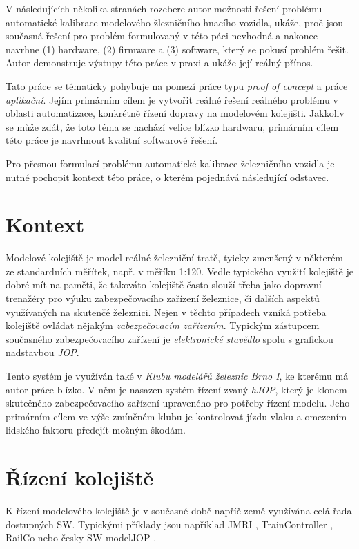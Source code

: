 V následujících několika stranách rozebere autor možnosti řešení problému
automatické kalibrace modelového žlezničního hnacího vozidla, ukáže, proč
jsou současná řešení pro problém formulovaný v této páci nevhodná a nakonec
navrhne (1) hardware, (2) firmware a (3) software, který se pokusí problém
řešit. Autor demonstruje výstupy této práce v praxi a ukáže její reálný
přínos.

Tato práce se tématicky pohybuje na pomezí práce typu \textit{proof of concept}
a práce \textit{aplikační}. Jejím primárním cílem je vytvořit reálné řešení
reálného problému v oblasti automatizace, konkrétně řízení dopravy na modelovém
kolejišti. Jakkoliv se může zdát, že toto téma se nachází velice blízko
hardwaru, primárním cílem této práce je navrhnout kvalitní softwarové řešení.

Pro přesnou formulací problému automatické kalibrace železničního vozidla je
nutné pochopit kontext této práce, o kterém pojednává následující odstavec.

\section{Kontext}

Modelové kolejiště je model reálné železniční tratě, tyicky zmenšený v některém
ze standardních měřítek, např. v měříku  1:120. Vedle typického 
využití kolejiště je dobré mít na paměti, že takováto kolejiště často slouží
třeba jako dopravní trenažéry pro výuku zabezpečovacího zařízení železnice,
či dalších aspektů využívaných na skutenčé železnici. Nejen v těchto případech
vzniká potřeba kolejiště ovládat nějakým \textit{zabezpečovacím zařízením}.
Typickým zástupcem současného zabezpečovacího zařízení je
\textit{elektronické stavědlo} spolu s grafickou nadstavbou \textit{JOP}.

Tento systém je využíván také v \textit{Klubu modelářů železnic Brno I}, ke
kterému má autor práce blízko. V něm je nasazen systém řízení zvaný
\textit{hJOP}, který je klonem skutečného zabezpečovacího zařízení upraveného
pro potřeby řízení modelu. Jeho primárním cílem ve výše zmíněném klubu je
kontrolovat jízdu vlaku a omezením lidského faktoru předejít možným škodám.

\section{Řízení kolejiště}

K řízení modelového kolejiště je v současné době napříč země využívána celá
řada dostupných SW. Typickými příklady jsou například JMRI \cite{},
TrainController \cite{}, RailCo \cite{} nebo česky SW modelJOP \cite{}.

